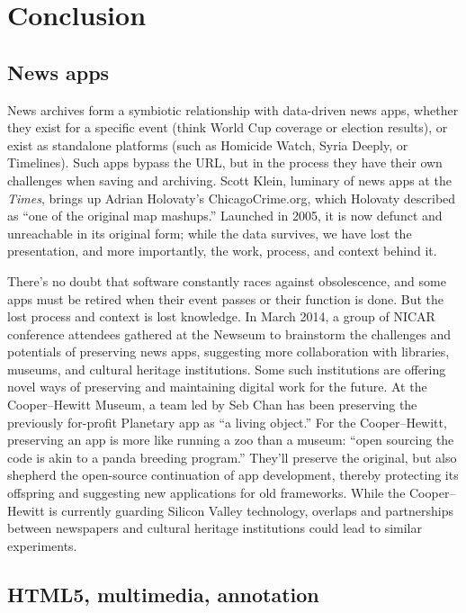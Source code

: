 \chapter{Conclusion}

\section{News apps}

News archives form a symbiotic relationship with data-driven news apps, whether they exist for a specific event (think World Cup coverage or election results), or exist as standalone platforms (such as Homicide Watch, Syria Deeply, or Timelines). Such apps bypass the URL, but in the process they have their own challenges when saving and archiving. Scott Klein, luminary of news apps at the \emph{Times}, brings up Adrian Holovaty's ChicagoCrime.org, which Holovaty described as ``one of the original map mashups.''\autocite{holovaty_memory_2008} Launched in 2005, it is now defunct and unreachable in its original form; while the data survives, we have lost the presentation, and more importantly, the work, process, and context behind it.

There's no doubt that software constantly races against obsolescence, and some apps must be retired when their event passes or their function is done. But the lost process and context is lost knowledge. In March 2014, a group of NICAR conference attendees gathered at the Newseum to brainstorm the challenges and potentials of preserving news apps, suggesting more collaboration with libraries, museums, and cultural heritage institutions.\autocite{_opennews/hackdays/archive_????} Some such institutions are offering novel ways of preserving and maintaining digital work for the future. At the Cooper--Hewitt Museum, a team led by Seb Chan has been preserving the previously for-profit Planetary app as ``a living object.'' For the Cooper--Hewitt, preserving an app is more like running a zoo than a museum: ``open sourcing the code is akin to a panda breeding program.''\autocite{chan_planetary:_2013} They'll preserve the original, but also shepherd the open-source continuation of app development, thereby protecting its offspring and suggesting new applications for old frameworks. While the Cooper--Hewitt is currently guarding Silicon Valley technology, overlaps and partnerships between newspapers and cultural heritage institutions could lead to similar experiments.

\section{HTML5, multimedia, annotation}

